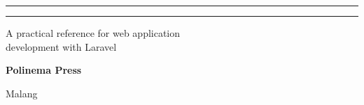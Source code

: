 \begin{titlepage}
    \vfill

    \begin{minipage}{1\textwidth}
        \centering
        \rule{0.25\textwidth}{0.6pt}\hspace{0.03\textwidth}\rule{0.25\textwidth}{0.6pt}\par
        \vspace{0.35cm}
        {\small\sffamily A practical reference for web application\\development with Laravel\par}
        \vspace{0.75cm}
        {\normalsize\bfseries Polinema Press\par}
        {\normalsize Malang \textbullet{} \the\year\par}
    \end{minipage}

\end{titlepage}

\cleardoublepage

